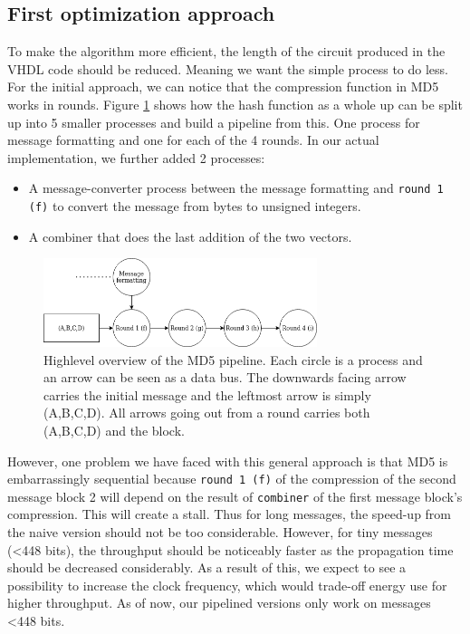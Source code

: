 \documentclass[a4paper, openany]{book}
\begin{document}
\begin{abstact}
\subsection{First optimization approach}
\label{sec:orgde51948}
To make the algorithm more efficient, the length of the circuit produced in the VHDL code should be reduced. Meaning we want the simple process to do less. For the initial approach, we can notice that the compression function in MD5 works in rounds. Figure \ref{fig:MD5opt1} shows how the hash function as a whole up can be split up into 5 smaller processes and build a pipeline from this. One process for message formatting and one for each of the 4 rounds. In our actual implementation, we further added 2 processes:
\begin{itemize}
\item A message-converter process between the message formatting and \texttt{round 1 (f)} to convert the message from bytes to unsigned integers.
\item A combiner that does the last addition of the two vectors.
\end{itemize}

\begin{figure}[H]
\centering
\includegraphics[width=8cm]{md5.png}
\caption[Pipeline MD5]{Highlevel overview of the MD5 pipeline. Each circle is a process and an arrow can be seen as a data bus. The downwards facing arrow carries the initial message and the leftmost arrow is simply (A,B,C,D). All arrows going out from a round carries both (A,B,C,D) and the block.}
\label{fig:MD5opt1}
\end{figure}

However, one problem we have faced with this general approach is that MD5 is embarrassingly sequential because \texttt{round 1 (f)} of the compression of the second message block 2 will depend on the result of \texttt{combiner} of the first message block's compression. This will create a stall. Thus for long messages, the speed-up from the naive version should not be too considerable. However, for tiny messages (<448 bits), the throughput should be noticeably faster as the propagation time should be decreased considerably. As a result of this, we expect to see a possibility to increase the clock frequency, which would trade-off energy use for higher throughput.
As of now, our pipelined versions only work on messages <448 bits.

\end{abstact}
\end{document}
